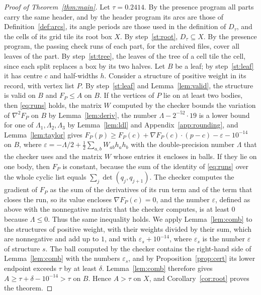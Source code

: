 \documentclass[11pt]{amsart}
\theoremstyle{definition}
\theoremstyle{remark}
\numberwithin{equation}{section}
\newcommand{\TAU}{0.2414}
\begin{document}
\begin{proof}[Proof of Theorem~\ref{thm:main}]
Let $\tau=\TAU$. By the presence program all parts carry the same header, and by the header program its arcs are those of Definition~\ref{def:arcs}, its angle periods are those used in the definition of $D_\tau$, and the cells of its grid tile its root box $X$. By step~\ref{st:root}, $D_\tau\subseteq X$. By the presence program, the passing check runs of each part, for the archived files, cover all leaves of the part. By step~\ref{st:tree}, the leaves of the tree of a cell tile the cell, since each split replaces a box by its two halves. Let $B$ be a leaf; by step~\ref{st:leaf} it has centre $c$ and half-widths $h$. Consider a structure of positive weight in its record, with vertex list $P$. By step~\ref{st:leaf} and Lemma~\ref{lem:valid}, the structure is valid on $B$ and $F_P\le A$ on $B$. If the vertices of $P$ lie on at least two bodies, then \eqref{eq:runs} holds, the matrix $W$ computed by the checker bounds the variation of $\nabla^2F_P$ on $B$ by Lemma~\ref{lem:deriv}, the number $\Lambda-2^{-52}\cdot19$ is a lower bound for one of $\Lambda_1,\Lambda_2,\Lambda_3$ by Lemma~\ref{lem:ldl} and Appendix~\ref{app:rounding}, and Lemma~\ref{lem:taylor} gives $F_P(p)\ge F_P(c)+\nabla F_P(c)\cdot(p-c)-\varepsilon-10^{-14}$ on $B$, where $\varepsilon=-\Lambda/2+\frac12\sum_{a,b}W_{ab}h_ah_b$ with the double-precision number $\Lambda$ that the checker uses and the matrix $W$ whose entries it encloses in balls. If they lie on one body, then $F_P$ is constant, because the sum of the identity of \eqref{eq:runs} over the whole cyclic list equals $\sum_j\det(q_j,q_{j+1})$. The checker computes the gradient of $F_P$ as the sum of the derivatives of its run term and of the term that closes the run, so its value encloses $\nabla F_P(c)=0$, and the number $\varepsilon$, defined as above with the nonnegative matrix that the checker computes, is at least $0$ because $\Lambda\le0$. Thus the same inequality holds. We apply Lemma~\ref{lem:comb} to the structures of positive weight, with their weights divided by their sum, which are nonnegative and add up to $1$, and with $\varepsilon_s+10^{-14}$, where $\varepsilon_s$ is the number $\varepsilon$ of structure $s$. The ball computed by the checker contains the right-hand side of Lemma~\ref{lem:comb} with the numbers $\varepsilon_s$, and by Proposition~\ref{prop:cert} its lower endpoint exceeds $\tau$ by at least $\delta$. Lemma~\ref{lem:comb} therefore gives $A\ge\tau+\delta-10^{-14}>\tau$ on $B$. Hence $A>\tau$ on $X$, and Corollary~\ref{cor:root} proves the theorem.
\end{proof}
\end{document}
